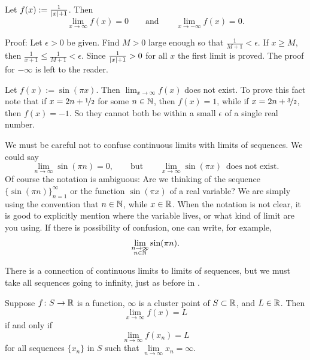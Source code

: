 \begin{example}
Let $f(x) := \frac{1}{\left\lvert {x} \right\rvert+1}$.  Then
\begin{equation*}
\lim_{x\to \infty} f(x) = 0 \qquad \text{and} \qquad
\lim_{x\to -\infty} f(x) = 0 .
\end{equation*}

Proof:
Let $\epsilon > 0$ be given.  Find $M > 0$ large enough
so that $\frac{1}{M+1} < \epsilon$.  If
$x \geq M$, then $\frac{1}{x+1} \leq \frac{1}{M+1} < \epsilon$.
Since $\frac{1}{\left\lvert {x} \right\rvert+1} > 0$ for all $x$ the first limit is proved.
The proof for $-\infty$ is left to the reader.
\end{example}

\begin{example}
Let $f(x) := \sin(\pi x)$.  Then $\lim_{x\to\infty} f(x)$ does not exist.
To prove this fact note that if $x = 2n+\nicefrac{1}{2}$ for some $n \in
{\mathbb{N}}$, then $f(x)=1$,
while if $x = 2n+\nicefrac{3}{2}$, then $f(x)=-1$.  So they cannot both be
within a small $\epsilon$ of a single real number.

We must be careful not to confuse continuous limits with limits of sequences.
We could say
\begin{equation*}
\lim_{n \to \infty} \sin(\pi n) = 0, \qquad \text{but} \qquad
\lim_{x \to \infty} \sin(\pi x) \enspace \text{does not exist}.
\end{equation*}
Of course the notation is ambiguous:  Are we thinking of the
sequence $\{ \sin (\pi n) \}_{n=1}^\infty$ or the function $\sin(\pi x)$
of a real variable?  We are simply using the convention
that $n \in {\mathbb{N}}$, while $x \in {\mathbb{R}}$.  When the notation is not clear,
it is good to explicitly mention where the variable lives, or what kind
of limit are you using.  If there is possibility of confusion, one can
write, for example,
\begin{equation*}
\lim_{\substack{n \to \infty\\n \in {\mathbb{N}}}} \sin(\pi n) .
\end{equation*}
\end{example}

There is a connection of continuous limits to limits of sequences, but we must take all
sequences going to infinity, just as before in .

\begin{lemma} \label{seqflimitinf:lemma}
Suppose $f \colon S \to {\mathbb{R}}$ is a function, $\infty$ is a cluster
point of $S \subset {\mathbb{R}}$, and $L \in {\mathbb{R}}$.  Then
\begin{equation*}
\lim_{x\to\infty} f(x) = L
\end{equation*}
if and only if
\begin{equation*}
\lim_{n\to\infty} f(x_n) = L
\end{equation*}
for all sequences $\{ x_n \}$ in $S$ such that $\lim\limits_{n\to\infty} x_n = \infty$.
\end{lemma}


